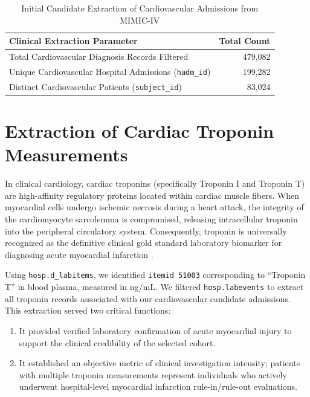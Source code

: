 \documentclass[12pt,a4paper,oneside]{report}
\begin{document}
\begin{table}[htbp]
\centering
\caption{Initial Candidate Extraction of Cardiovascular Admissions from MIMIC-IV}
\label{tab:initial_extraction}
\begin{tabular}{@{}lr@{}}
\toprule
\textbf{Clinical Extraction Parameter} & \textbf{Total Count} \\ \midrule
Total Cardiovascular Diagnosis Records Filtered & 479,082 \\
Unique Cardiovascular Hospital Admissions (\texttt{hadm\_id}) & 199,282 \\
Distinct Cardiovascular Patients (\texttt{subject\_id}) & 83,024 \\ \bottomrule
\end{tabular}
\end{table}

\section{Extraction of Cardiac Troponin Measurements}
\label{sec:troponin_extraction}

In clinical cardiology, cardiac troponins (specifically Troponin I and Troponin T) are high-affinity regulatory proteins located within cardiac muscle fibers. When myocardial cells undergo ischemic necrosis during a heart attack, the integrity of the cardiomyocyte sarcolemma is compromised, releasing intracellular troponin into the peripheral circulatory system. Consequently, troponin is universally recognized as the definitive clinical gold standard laboratory biomarker for diagnosing acute myocardial infarction \citep{thygesen2018fourth}.

Using \texttt{hosp.d\_labitems}, we identified \texttt{itemid 51003} corresponding to ``Troponin T'' in blood plasma, measured in ng/mL. We filtered \texttt{hosp.labevents} to extract all troponin records associated with our cardiovascular candidate admissions. This extraction served two critical functions:
\begin{enumerate}
    \item It provided verified laboratory confirmation of acute myocardial injury to support the clinical credibility of the selected cohort.
    \item It established an objective metric of clinical investigation intensity; patients with multiple troponin measurements represent individuals who actively underwent hospital-level myocardial infarction rule-in/rule-out evaluations.
\end{enumerate}
\end{document}
